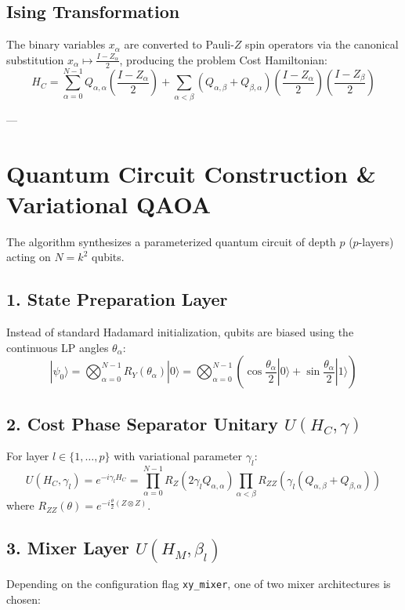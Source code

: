 \documentclass[11pt,a4paper]{article}
\begin{document}
\subsection{Ising Transformation}
The binary variables $x_\alpha$ are converted to Pauli-$Z$ spin operators via the canonical substitution $x_\alpha \mapsto \frac{I - Z_\alpha}{2}$, producing the problem Cost Hamiltonian:
\begin{equation}
H_C = \sum_{\alpha=0}^{N-1} Q_{\alpha,\alpha} \left(\frac{I - Z_\alpha}{2}\right) + \sum_{\alpha < \beta} \left(Q_{\alpha,\beta} + Q_{\beta,\alpha}\right) \left(\frac{I - Z_\alpha}{2}\right)\left(\frac{I - Z_\beta}{2}\right)
\end{equation}

---

\section{Quantum Circuit Construction \& Variational QAOA}

The algorithm synthesizes a parameterized quantum circuit of depth $p$ ($p$-layers) acting on $N = k^2$ qubits.

\subsection{1. State Preparation Layer}
Instead of standard Hadamard initialization, qubits are biased using the continuous LP angles $\theta_\alpha$:
\begin{equation}
|\psi_0\rangle = \bigotimes_{\alpha=0}^{N-1} R_Y(\theta_\alpha)|0\rangle = \bigotimes_{\alpha=0}^{N-1} \left( \cos\frac{\theta_\alpha}{2}|0\rangle + \sin\frac{\theta_\alpha}{2}|1\rangle \right)
\end{equation}

\subsection{2. Cost Phase Separator Unitary $U(H_C, \gamma)$}
For layer $l \in \{1, \dots, p\}$ with variational parameter $\gamma_l$:
\begin{equation}
U(H_C, \gamma_l) = e^{-i \gamma_l H_C} = \prod_{\alpha=0}^{N-1} R_Z\left(2 \gamma_l Q_{\alpha,\alpha}\right) \prod_{\alpha < \beta} R_{ZZ}\left(\gamma_l (Q_{\alpha,\beta} + Q_{\beta,\alpha})\right)
\end{equation}
where $R_{ZZ}(\theta) = e^{-i \frac{\theta}{2} (Z \otimes Z)}$.

\subsection{3. Mixer Layer $U(H_M, \beta_l)$}
Depending on the configuration flag \texttt{xy\_mixer}, one of two mixer architectures is chosen:
\end{document}
